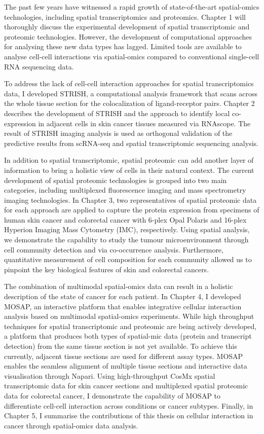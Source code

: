 The past few years have witnessed a rapid growth of state-of-the-art spatial-omics technologies, including spatial transcriptomics and proteomics. Chapter 1 will thoroughly discuss the experimental development of spatial transcriptomic and proteomic technologies. However, the development of computational approaches for analysing these new data types has lagged. Limited tools are available to analyse cell-cell interactions via spatial-omics compared to conventional single-cell RNA sequencing data. 

To address the lack of cell-cell interaction approaches for spatial transcriptomics data, I developed STRISH, a computational analysis framework that scans across the whole tissue section for the colocalization of ligand-receptor pairs. Chapter 2 describes the development of STRISH and the approach to identify local co-expression in adjacent cells in skin cancer tissues measured via RNAscope. The result of STRISH imaging analysis is used as orthogonal validation of the predictive results from scRNA-seq and spatial transcriptomic sequencing analysis.

In addition to spatial transcriptomic, spatial proteomic can add another layer of information to bring a holistic view of cells in their natural context. The current development of spatial proteomic technologies is grouped into two main categories, including multiplexed fluorescence imaging and mass spectrometry imaging technologies. In Chapter 3, two representatives of spatial proteomic data for each approach are applied to capture the protein expression from specimens of human skin cancer and colorectal cancer with 6-plex Opal Polaris and 16-plex Hyperion Imaging Mass Cytometry (IMC), respectively. Using spatial analysis, we demonstrate the capability to study the tumour microenvironment through cell community detection and via co-occurrence analysis. Furthermore, quantitative measurement of cell composition for each community allowed us to pinpoint the key biological features of skin and colorectal cancers.  

The combination of multimodal spatial-omics data can result in a holistic description of the state of cancer for each patient.  In Chapter 4, I developed MOSAP, an interactive platform that enables integrative cellular interaction analysis based on multimodal spatial-omics experiments. While high throughput techniques for spatial transcriptomic and proteomic are being actively developed, a platform that produces both types of spatial-mic data (protein and transcript detection) from the same tissue section is not yet available. To achieve this currently, adjacent tissue sections are used for different assay types. MOSAP enables the seamless alignment of multiple tissue sections and interactive data visualisation through Napari. Using high-throughput CosMx spatial transcriptomic data for skin cancer sections and multiplexed spatial proteomic data for colorectal cancer, I demonstrate the capability of MOSAP to differentiate cell-cell interaction across conditions or cancer subtypes. Finally, in Chapter 5, I summarise the contributions of this thesis on cellular interaction in cancer through spatial-omics data analysis.

